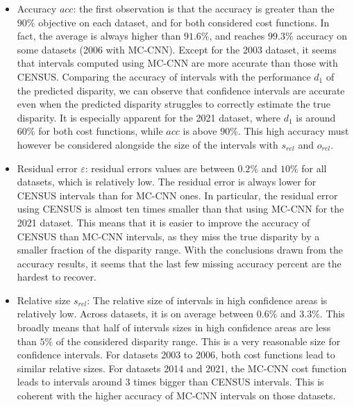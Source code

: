 \begin{itemize}
    \item Accuracy $acc$: the first observation is that the accuracy is greater than the $90\%$ objective on each dataset, and for both considered cost functions. In fact, the average is always higher than $91.6\%$, and reaches $99.3\%$ accuracy on some datasets (2006 with MC-CNN). Except for the $2003$ dataset, it seems that intervals computed using MC-CNN are more accurate than those with CENSUS. Comparing the accuracy of intervals with the performance $d_1$ of the predicted disparity, we can observe that confidence intervals are accurate even when the predicted disparity struggles to correctly estimate the true disparity. It is especially apparent for the 2021 dataset, where $d_1$ is around $60\%$ for both cost functions, while $acc$ is above $90\%$. This high accuracy must however be considered alongside the size of the intervals with $s_{rel}$ and $o_{rel}$.
    
    \item Residual error $\varepsilon$: residual errors values are between $0.2\%$ and $10\%$ for all datasets, which is relatively low. The residual error is always lower for CENSUS intervals than for MC-CNN ones. In particular, the residual error using CENSUS is almost ten times smaller than that using MC-CNN for the 2021 dataset. This means that it is easier to improve the accuracy of CENSUS than MC-CNN intervals, as they miss the true disparity by a smaller fraction of the disparity range. With the conclusions drawn from the accuracy results, it seems that the last few missing accuracy percent are the hardest to recover.
    
    \item Relative size $s_{rel}$: The relative size of intervals in high confidence areas is relatively low. Across datasets, it is on average between $0.6\%$ and $3.3\%$. This broadly means that half of intervals sizes in high confidence areas are less than $5\%$ of the considered disparity range. This is a very reasonable size for confidence intervals. For datasets 2003 to 2006, both cost functions lead to similar relative sizes. For datasets 2014 and 2021, the MC-CNN cost function leads to intervals around 3 times bigger than CENSUS intervals. This is coherent with the higher accuracy of MC-CNN intervals on those datasets.
    

\end{itemize}
